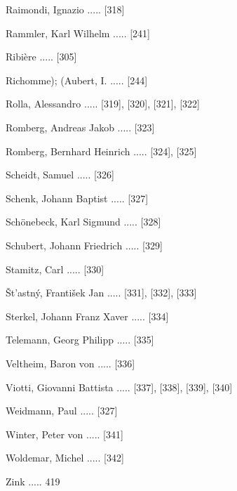 \documentclass[twocolumn]{book}
\begin{document}
\newline 
Raimondi, Ignazio ..... [318]

\newline 
Rammler, Karl Wilhelm ..... [241]

\newline 
Ribière ..... [305]

\newline 
Richomme); (Aubert, I. ..... [244]

\newline 
Rolla, Alessandro ..... [319], [320], [321], [322]

\newline 
Romberg, Andreas Jakob ..... [323]

\newline 
Romberg, Bernhard Heinrich ..... [324], [325]

\newline 
Scheidt, Samuel ..... [326]

\newline 
Schenk, Johann Baptist ..... [327]

\newline 
Schönebeck, Karl Sigmund ..... [328]

\newline 
Schubert, Johann Friedrich ..... [329]

\newline 
Stamitz, Carl ..... [330]

\newline 
Št'astný, František Jan ..... [331], [332], [333]

\newline 
Sterkel, Johann Franz Xaver ..... [334]

\newline 
Telemann, Georg Philipp ..... [335]

\newline 
Veltheim, Baron von ..... [336]

\newline 
Viotti, Giovanni Battista ..... [337], [338], [339], [340]

\newline 
Weidmann, Paul ..... [327]

\newline 
Winter, Peter von ..... [341]

\newline 
Woldemar, Michel ..... [342]

\newline 
Zink ..... 419
\end{document}
